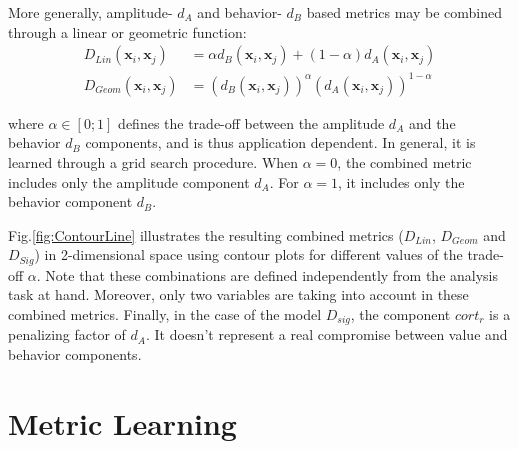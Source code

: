 \noindent More generally, amplitude- $d_A$ and behavior- $d_{B}$ based metrics may be combined through a linear or geometric function: 
\begin{align}
D_{Lin}(\textbf{x}_i,\textbf{x}_j) &= \alpha d_{B}(\textbf{x}_i,\textbf{x}_j) + (1-\alpha) d_A(\textbf{x}_i,\textbf{x}_j)  \label{eq:DLin}   \\
D_{Geom}(\textbf{x}_i,\textbf{x}_j) &= (d_{B}(\textbf{x}_i,\textbf{x}_j))^\alpha  (d_A(\textbf{x}_i,\textbf{x}_j))^{1-\alpha} \label{eq:DGeom}
\end{align}

\noindent where $\alpha \in [0;1]$ defines the trade-off between the amplitude $d_A$ and the behavior $d_B$ components, and is thus application dependent. In general, it is learned through a grid search procedure. When $\alpha=0$, the combined metric includes only the amplitude component $d_A$. For $\alpha=1$, it includes only the behavior component $d_B$. 

Fig.\ref{fig:ContourLine} illustrates the resulting combined metrics ($D_{Lin}$, $D_{Geom}$ and $D_{Sig}$) in 2-dimensional space using contour plots for different values of the trade-off $\alpha$. Note that these combinations are defined independently from the analysis task at hand. Moreover, only two variables are taking into account in these combined metrics. Finally, in the case of the model $D_{sig}$, the component $cort_r$ is a penalizing factor of $d_A$. It doesn't represent a real compromise between value and behavior components. 

\section{Metric Learning}

